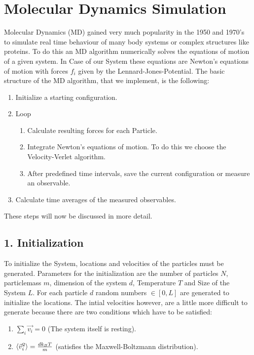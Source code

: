 \section{Molecular Dynamics Simulation}
Molecular Dynamics (MD) gained very much popularity in the 1950 and 1970's to simulate real time behaviour of many body systems or complex structures like proteins. To do this an MD algorithm numerically solves the equations of motion of a given system. In Case of our System these equations are Newton's equations of motion with forces $f_i$ given by the Lennard-Jones-Potential. The basic structure of the MD algorithm, that we implement, is the following:

\begin{enumerate}
\item Initialize a starting configuration.
\item Loop
\begin{enumerate}
\item Calculate resulting forces for each Particle.
\item Integrate Newton's equations of motion. To do this we choose the Velocity-Verlet algorithm.
\item After predefined time intervals, save the current configuration or measure an observable.
\end{enumerate}
\item Calculate time averages of the measured observables.
\end{enumerate}

These steps will now be discussed in more detail.

\subsection*{1. Initialization}

To initialize the System, locations and velocities of the particles must be generated. Parameters for the initialization are the number of particles $N$, particlemass $m$, dimension of the system $d$, Temperature $T$ and Size of the System $L$. For each particle $d$ random numbers $\in [0,L]$ are generated to initialize the locations. 
The intial velocities however, are a little more difficult to generate because there are two conditions which have to be satisfied:

\begin{enumerate}
\item $\sum_i \vec{v_i}=0$ (The system itself is resting).
\item $\braket{\vec{v}_i^2}=\frac{d k_B T}{m}$ (satisfies the Maxwell-Boltzmann distribution).
\end{enumerate}

